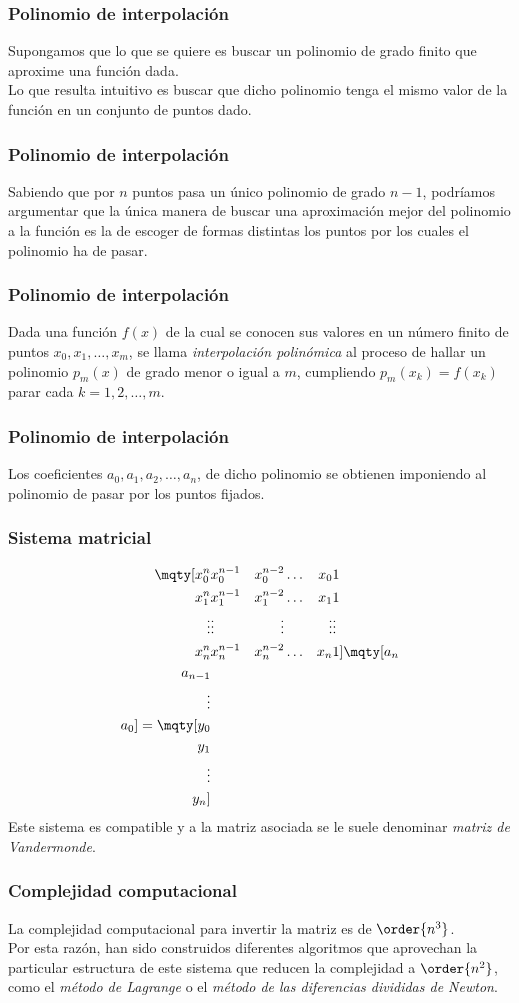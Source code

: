 \begin{frame}
\frametitle{Polinomio de interpolación}
Supongamos que lo que se quiere es buscar un polinomio de grado finito que aproxime una función dada.
\\
\bigskip
\pause
Lo que resulta intuitivo es buscar que dicho polinomio tenga el mismo valor de la función en un conjunto de puntos dado.
\end{frame}
\begin{frame}
\frametitle{Polinomio de interpolación}
Sabiendo que por $n$ puntos pasa un único polinomio de grado $n-1$, podríamos argumentar que la única manera de buscar una aproximación mejor del polinomio a la función es la de escoger de formas distintas los puntos por los cuales el polinomio ha de pasar.
\end{frame}
\begin{frame}
\frametitle{Polinomio de interpolación}
Dada una función $f(x)$ de la cual se conocen sus valores en un número finito de puntos $x_{0}, x_{1}, \ldots, x_{m}$, se llama \emph{interpolación polinómica} al proceso de hallar un polinomio $p_{m}(x)$ de grado menor o igual a $m$, cumpliendo $p_{m}(x_{k}) = f(x_{k})$ parar cada $k = 1, 2, \ldots, m$.
\end{frame}
\begin{frame}
\frametitle{Polinomio de interpolación}
Los coeficientes $a_{0}, a_{1}, a_{2}, \ldots, a_{n}$, de dicho polinomio se obtienen imponiendo al polinomio de pasar por los puntos fijados.
\end{frame}
\begin{frame}
\frametitle{Sistema matricial}
\begin{align*}
\mqty[
x_{0}^{n} & x_{0}^{n-1} & x_{0}^{n-2} & \ldots & x_{0} & 1 \\
x_{1}^{n} & x_{1}^{n-1} & x_{1}^{n-2} & \ldots & x_{1} & 1 \\
\vdots & \vdots & \vdots & & \vdots & \vdots \\
x_{n}^{n} & x_{n}^{n-1} & x_{n}^{n-2} & \ldots & x_{n} & 1 
]
\mqty[
a_{n} \\ a_{n-1} \\ \vdots \\ a_{0}
]
=
\mqty[
y_{0} \\ y_{1} \\ \vdots \\ y_{n}
]
\end{align*}
\pause
Este sistema es compatible y a la matriz asociada se le suele denominar \emph{matriz de Vandermonde}.
\end{frame}
\begin{frame}
\frametitle{Complejidad computacional}
La complejidad computacional para invertir la matriz es de $\order{n^{3}}$.
\\
\bigskip
\pause
Por esta razón, han sido construidos diferentes algoritmos que aprovechan la particular estructura de este sistema que reducen la complejidad a $\order{n^{2}}$, como el \emph{método de Lagrange} o el \emph{método de las diferencias divididas de Newton}.
\end{frame}
